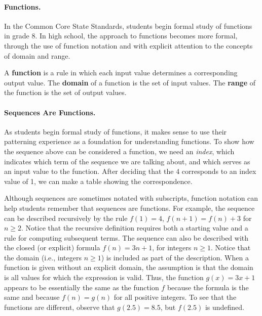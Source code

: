 \paragraph{Functions.}  In the Common Core State Standards, students begin formal study of functions in grade 8.  
In high school, the approach to functions becomes more formal, through the use of function notation and with explicit attention to the concepts of domain and range.   

\begin{definition}
A \textbf{function} is a rule in which each input value determines a corresponding output value.  The \textbf{domain} of a function is the set of input values.  The \textbf{range} of the function is the set of output values.
\end{definition}

\paragraph{Sequences Are Functions.} As students begin formal study of functions, it makes sense to use their patterning experience as a foundation for understanding functions.  To show how the sequence above can be considered a function, we need an \textit{index}, which indicates which term of the sequence we are talking about, and which serves as an input value to the function.  After deciding that the 4 corresponds to an index value of 1, we can make a table showing 
the correspondence.


Although sequences are sometimes notated with subscripts, function notation can help students remember that sequences are functions.  For example, the sequence can be described recursively by the rule $f(1) = 4$, $f(n+1) = f(n) + 3$ for $n \geq 2$.  Notice that the recursive definition requires both a starting value and a rule for computing subsequent terms.   
The sequence can also be described with the closed (or explicit) formula  $f(n) = 3n + 1$, for integers $n \geq 1$.  Notice that the domain (i.e., integers $n\geq 1$) is included as part of the description.  When a function is given without an explicit domain, the assumption is that the domain is all values for which the expression is valid.  Thus, the function $g(x) = 3x + 1$ appears to be essentially the same as the function $f$ because the formula is the same and because $f(n) = g(n)$ for all positive integers.  To see that the functions are different, observe that $g(2.5) = 8.5$, but $f(2.5)$ is undefined.  

